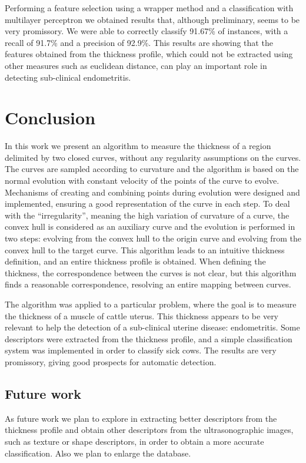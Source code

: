 \documentclass{article}
\begin{document}
Performing a feature selection using a wrapper method and a classification with multilayer perceptron we obtained results that, although preliminary, seems to be very promissory. We were able to correctly classify 91.67\% of instances, with a recall of 91.7\% and a precision of 92.9\%. This results are showing that the features obtained from the thickness profile, which could not be extracted using other measures such as euclidean distance, can play an important role in detecting sub-clinical endometritis.

\section{Conclusion}
\label{sec:conc}
In this work we present an algorithm to measure the thickness of a region delimited by two closed curves, without any regularity assumptions on the curves. The curves are sampled according to curvature and the algorithm is based on the normal evolution with constant velocity of the points of the curve to evolve. Mechanisms of creating and combining points during evolution were designed and implemented, ensuring a good representation of the curve in each step. To deal with the ``irregularity'', meaning the high variation of curvature of a curve, the convex hull is considered as an auxiliary curve and the evolution is performed in two steps: evolving from the convex hull to the origin curve and evolving from the convex hull to the target curve. This algorithm leads to an intuitive thickness definition, and an entire thickness profile is obtained. When defining the thickness, the correspondence between the curves is not clear, but this algorithm finds a reasonable correspondence, resolving an entire mapping between curves.

The algorithm was applied to a particular problem, where the goal is to measure the thickness of a muscle of cattle uterus. This thickness appears to be very relevant to help the detection of a sub-clinical uterine disease: endometritis. Some descriptors were extracted from the thickness profile, and a simple classification system was implemented in order to classify sick cows. The results are very promissory, giving good prospects for automatic detection.

\subsection{Future work}
\label{ssec:future}
As future work we plan to explore in extracting better descriptors from the thickness profile and obtain other descriptors from the ultrasonographic images, such as texture or shape descriptors, in order to obtain a more accurate classification. Also we plan to enlarge the database.
\end{document}

